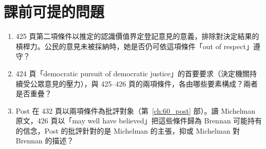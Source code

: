 \section{課前可提的問題}
\label{sec:50_brennan-6}

\begin{enumerate}
\tightlist
\item 425 頁第二項條件以推定的認識價值界定登記意見的意義，排除對決定結果的槓桿力。公民的意見未被採納時，她是否仍可依這項條件「out of respect」遵守？
\item 424 頁「democratic pursuit of democratic justice」的首要要求（決定機關持續受公眾意見的壓力），與 425--426 頁的兩項條件，各由哪些要素構成？兩者是否重疊？
\item Post 在 432 頁以兩項條件為批評對象（第~\ref{ch:60_post} 部）。讀 Michelman 原文，426 頁以「may well have believed」把這些條件歸為 Brennan 可能持有的信念，Post 的批評針對的是 Michelman 的主張，抑或 Michelman 對 Brennan 的描述？
\end{enumerate}

